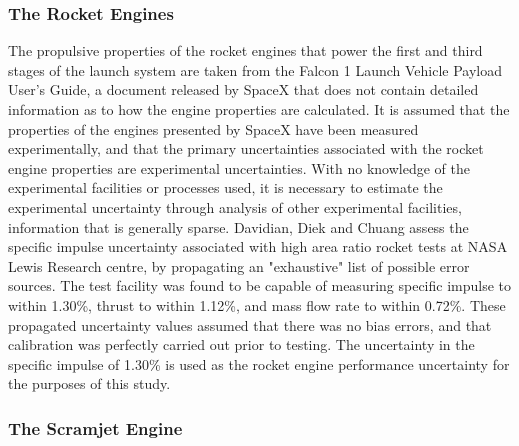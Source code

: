 \subsubsection{The Rocket Engines}
The propulsive properties of the rocket engines that power the first and third stages of the launch system are taken from the Falcon 1 Launch Vehicle Payload User's Guide\cite{Vehicle2008}, a document released by SpaceX that does not contain detailed information as to how the engine properties are calculated. It is assumed that the properties of the engines presented by SpaceX have been measured experimentally, and that the primary uncertainties associated with the rocket engine properties are experimental uncertainties. With no knowledge of the experimental facilities or processes used, it is necessary to estimate the experimental uncertainty through analysis of other experimental facilities, information that is generally sparse. Davidian, Diek and Chuang\cite{Davidian1987} assess the specific impulse uncertainty associated with high area ratio rocket tests at NASA Lewis Research centre, by propagating an "exhaustive" list of possible error sources. The test facility was found to be capable of measuring specific impulse to within 1.30\%, thrust to within 1.12\%, and mass flow rate to within 0.72\%. These propagated uncertainty values assumed that there was no bias errors, and that calibration was perfectly carried out prior to testing. 
The uncertainty in the specific impulse of 1.30\% is used as the rocket engine performance uncertainty for the purposes of this study. 

\subsubsection{The Scramjet Engine}



